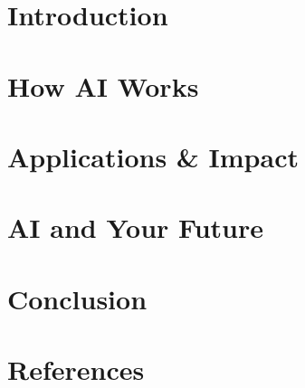 \section[Intro]{Introduction}


\section[HowItWorks]{How AI Works}


\section[Applications]{Applications \& Impact}


\section[Careers]{AI and Your Future}


\section[Concl]{Conclusion}


\section[Refs]{References}


